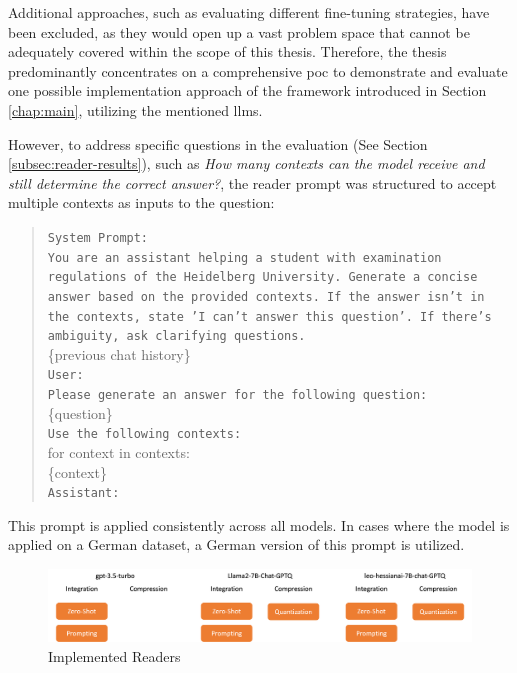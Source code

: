 Additional approaches, such as evaluating different fine-tuning strategies, have been excluded, as they would open up a vast problem space that cannot be adequately covered within the scope of this thesis. Therefore, the thesis predominantly concentrates on a comprehensive \gls{poc} to demonstrate and evaluate one possible implementation approach of the framework introduced in Section \ref{chap:main}, utilizing the mentioned \gls{llm}s.

However, to address specific questions in the evaluation (See Section \ref{subsec:reader-results}), such as \textit{How many contexts can the model receive and still determine the correct answer?}, the reader prompt was structured to accept multiple contexts as inputs to the question:

\begin{quote}
    \texttt{System Prompt:} \\
    \texttt{You are an assistant helping a student with examination regulations of the Heidelberg University. Generate a concise answer based on the provided contexts. If the answer isn't in the contexts, state 'I can't answer this question'. If there's ambiguity, ask clarifying questions.} \\
    \{previous chat history\}\\
    \texttt{User:} \\
    \texttt{Please generate an answer for the following question:} \\
    \{question\} \\
    \texttt{Use the following contexts:} \\
    for context in contexts: \\
    \hspace*{1cm}\{context\} \\
    \texttt{Assistant:} \\
\end{quote}

This prompt is applied consistently across all models. In cases where the model is applied on a German dataset, a German version of this prompt is utilized.


\begin{figure}
    \centering
    \includegraphics[width=\textwidth]{Grafiken/Evaluation/reader_implemented.png}
    \caption{Implemented Readers}
    \label{fig:reader-implementation}
\end{figure}

